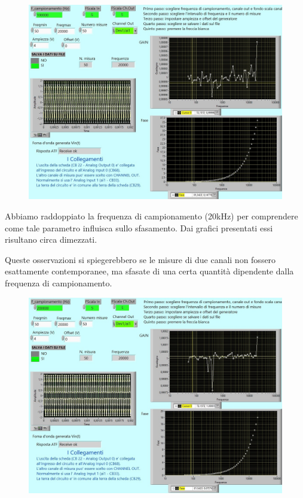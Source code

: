 \begin{figure}[H]
\caption{}
    \includegraphics[width=12cm]{settimana_2/immagini/corto_4.jpg}
    \centering
\end{figure}


Abbiamo raddoppiato la frequenza di campionamento (20kHz) per comprendere come tale parametro influisca sullo sfasamento. Dai grafici presentati essi risultano circa dimezzati.

Queste osservazioni si spiegerebbero se le misure di due canali non fossero esattamente contemporanee, ma sfasate di una certa quantità dipendente dalla frequenza di campionamento.

\begin{figure}[H]
\caption{}
    \includegraphics[width=12cm]{settimana_2/immagini/corto_5.jpg}
    \centering
\end{figure}

